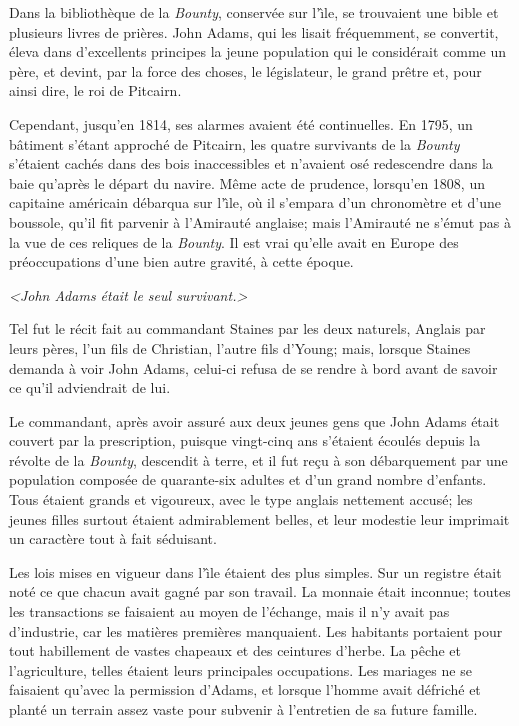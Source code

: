 Dans la biblioth\`eque de la {\sl Bounty},
conserv\'ee sur l'{\^\i}le, se trouvaient une bible
et plusieurs livres de pri\`eres. John Adams, qui les
lisait fr\'equemment, se convertit, \'eleva dans
d'excellents principes la jeune population qui le
consid\'erait comme un p\`ere, et devint,
par la force des choses, le l\'egislateur, le grand
pr\^etre et, pour ainsi dire, le roi de Pitcairn.

Cependant, jusqu'en 1814, ses alarmes avaient \'et\'e
continuelles. En 1795, un b\^atiment s'\'etant
approch\'e de Pitcairn, les quatre survivants de la
{\sl Bounty\/} s'\'etaient cach\'es dans des bois
inaccessibles et n'avaient os\'e redescendre dans la baie
qu'apr\`es le d\'epart du navire. M\^eme acte
de prudence, lorsqu'en 1808, un capitaine am\'ericain%
d\'ebarqua sur l'{\^\i}le, o\`u il s'empara d'un
chronom\`etre et d'une boussole, qu'il fit parvenir
\`a l'Amiraut\'e anglaise; mais l'Amiraut\'e
ne s'\'emut pas \`a la vue de ces reliques de la
{\sl Bounty}. Il est vrai qu'elle avait en Europe des
pr\'eoccupations d'une bien autre gravit\'e,
\`a cette \'epoque.

\pageinsert
\vskip 15cm
\centerline{}
\smallskip
\centerline{\it <John Adams \'etait le seul survivant.>}
\vfill
\endinsert

Tel fut le r\'ecit fait au commandant Staines par les
deux naturels, Anglais par leurs p\`eres, l'un fils
de Christian, l'autre fils d'Young; mais, lorsque Staines
demanda \`a voir John Adams, celui-ci refusa de se
rendre \`a bord avant de savoir ce qu'il adviendrait de lui.

Le commandant, apr\`es avoir assur\'e aux deux
jeunes gens que John Adams \'etait couvert par la
prescription, puisque vingt-cinq ans s'\'etaient
\'ecoul\'es depuis la r\'evolte de la {\sl Bounty},
descendit \`a terre, et il fut re\c{c}u \`a son
d\'ebarquement par une population compos\'ee de
quarante-six adultes et d'un grand nombre d'enfants.
Tous \'etaient grands et vigoureux, avec le type anglais
nettement accus\'e; les jeunes filles surtout
\'etaient admirablement belles, et leur modestie leur
imprimait un caract\`ere tout \`a fait s\'eduisant.

Les lois mises en vigueur dans l'{\^\i}le \'etaient
des plus simples. Sur un registre \'etait not\'e
ce que chacun avait gagn\'e par son travail.
La monnaie \'etait inconnue; toutes les transactions
se faisaient au moyen de l'\'echange, mais il n'y avait
pas d'industrie, car les mati\`eres premi\`eres
manquaient. Les habitants portaient pour tout habillement
de vastes chapeaux et des ceintures d'herbe.
La p\^eche et l'agriculture, telles \'etaient
leurs principales occupations. Les mariages ne se faisaient
qu'avec la permission d'Adams, et lorsque l'homme avait
d\'efrich\'e et plant\'e un terrain assez
vaste pour subvenir \`a l'entretien de sa future famille.

